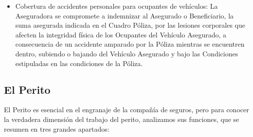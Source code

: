\begin{itemize}
	\item Cobertura de accidentes personales para ocupantes de vehículos: La Aseguradora se compromete a indemnizar al Asegurado o Beneficiario,  la suma asegurada indicada en el Cuadro Póliza, por las lesiones corporales que afecten la integridad física de los Ocupantes del Vehículo Asegurado, a consecuencia de un accidente amparado por la Póliza mientras se encuentren dentro, subiendo o bajando del Vehículo Asegurado y bajo las Condiciones estipuladas en las condiciones de la Póliza.


\end{itemize}

\setlength{\parskip}{0mm}

\subsection{El Perito}
\setlength{\parskip}{5mm}
	El Perito es esencial en el engranaje de la compañía de seguros, pero para conocer la verdadera dimensión del trabajo del perito, analizamos sus funciones, que se resumen en tres grandes apartados:


